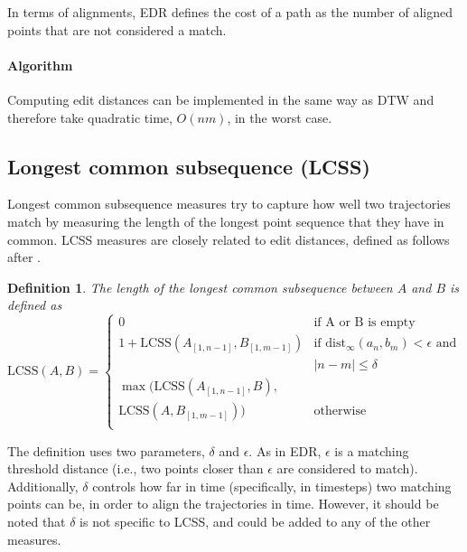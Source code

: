 \documentclass{interact}
\newcommand{\dist}{\ensuremath{\text{dist}}}
\newcommand{\LCSS}{\ensuremath{\text{LCSS}}}
\newtheorem{definition}{Definition}
\begin{document}

In terms of alignments, EDR defines the cost of a path as the number of aligned points that are not considered a match.

\paragraph*{Algorithm}
Computing edit distances can be implemented in the same way as DTW and therefore take quadratic time, $O(nm)$, in the worst case.


\subsection{Longest common subsequence (LCSS)}
Longest common subsequence measures try to capture how well two trajectories match by measuring the length of the longest point sequence that they have in common. LCSS measures are closely related to edit distances, defined as follows after \cite{VlachosGK02}.

\begin{definition}
The length of the longest common subsequence between $A$ and $B$ is defined as
\[
\LCSS(A,B) =
\left\{
	\begin{array}{ll}
		0  & \mbox{if A or B is empty} \\
		1+\LCSS(A_{[1,n-1]},B_{[1,m-1]}) & \mbox{if } \dist_\infty(a_n,b_m) < \epsilon  \mbox{ and } \\ &|n-m| \leq \delta \\
		\max( \LCSS(A_{[1,n-1]},B), \\ \LCSS(A,B_{[1,m-1]})) & \mbox{otherwise } \\
		\end{array}
\right.
\]
\end{definition}

The definition uses two parameters, $\delta$ and $\epsilon$.
As in EDR, $\epsilon$ is a matching threshold distance (i.e., two points closer than $\epsilon$ are considered to match).
Additionally, $\delta$ controls how far in time (specifically, in timesteps) two matching points can be, in order to align the trajectories in time.
However, it should be noted that $\delta$ is not specific to LCSS, and could be added to any of the other measures.
\end{document}
